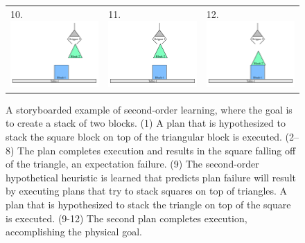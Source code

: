 \begin{figure}
\begin{center}
\begin{tabular}{p{4cm}p{4cm}p{4cm}}
10. \includegraphics[width=4cm]{gfx/blocks_world_example-10} & 11. \includegraphics[width=4cm]{gfx/blocks_world_example-11} & 12. \includegraphics[width=4cm]{gfx/blocks_world_example-12}
\end{tabular}
\end{center}
\caption[A storyboard of the implemented example of second-order
  learning.]{A storyboarded example of second-order learning, where
  the goal is to create a stack of two blocks.  (1) A plan that is
  hypothesized to stack the square block on top of the triangular
  block is executed.  (2--8) The plan completes execution and results
  in the square falling off of the triangle, an expectation failure.
  (9) The second-order hypothetical heuristic is learned that predicts
  plan failure will result by executing plans that try to stack
  squares on top of triangles.  A plan that is hypothesized to stack
  the triangle on top of the square is executed.  (9-12) The second
  plan completes execution, accomplishing the physical goal.}
\label{figure:implemented_example_learning_storyboard}
\end{figure}

